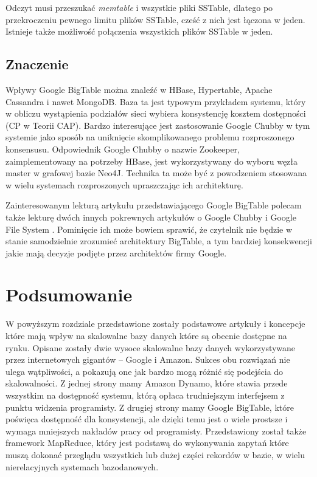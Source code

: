 Odczyt musi przeszukać \emph{memtable} i wszystkie pliki SSTable, dlatego po przekroczeniu pewnego limitu plików SSTable, cześć z nich jest łączona w jeden.
Istnieje także możliwość połączenia wszystkich plików SSTable w jeden.

\subsection*{Znaczenie}

Wpływy Google BigTable można znaleźć w HBase, Hypertable, Apache Cassandra i nawet MongoDB.
Baza ta jest typowym przykładem systemu, który w obliczu wystąpienia podziałów sieci wybiera konsystencję kosztem dostępności (CP w Teorii CAP).
Bardzo interesujące jest zastosowanie Google Chubby w tym systemie jako sposób na uniknięcie skomplikowanego problemu rozproszonego konsensusu.
Odpowiednik Google Chubby o nazwie Zookeeper, zaimplementowany na potrzeby HBase, jest wykorzystywany do wyboru węzła master w grafowej bazie Neo4J.
Technika ta może być z powodzeniem stosowana w wielu systemach rozproszonych upraszczając ich architekturę.

Zainteresowanym lekturą artykułu przedstawiającego Google BigTable \cite{google-bigtable} polecam także lekturę dwóch innych pokrewnych artykułów o Google Chubby \cite{google-chubby} i Google File System \cite{google-file-system}.
Pominięcie ich może bowiem sprawić, że czytelnik nie będzie w stanie samodzielnie zrozumieć architektury BigTable, a tym bardziej konsekwencji jakie mają decyzje podjęte przez architektów firmy Google.

\section{Podsumowanie}

W powyższym rozdziale przedstawione zostały podstawowe artykuły i koncepcje które mają wpływ na skalowalne bazy danych które są obecnie dostępne na rynku.
Opisane zostały dwie wysoce skalowalne bazy danych wykorzystywane przez internetowych gigantów -- Google i Amazon.
Sukces obu rozwiązań nie ulega wątpliwości, a pokazują one jak bardzo mogą różnić się podejścia do skalowalności.
Z jednej strony mamy Amazon Dynamo, które stawia przede wszystkim na dostępność systemu, którą opłaca trudniejszym interfejsem z punktu widzenia programisty.
Z drugiej strony mamy Google BigTable, które poświęca dostępność dla konsystencji, ale dzięki temu jest o wiele prostsze i wymaga mniejszych nakładów pracy od programisty.
Przedstawiony został także framework MapReduce, który jest podstawą do wykonywania zapytań które muszą dokonać przeglądu wszystkich lub dużej części rekordów w bazie, w wielu nierelacyjnych systemach bazodanowych.
